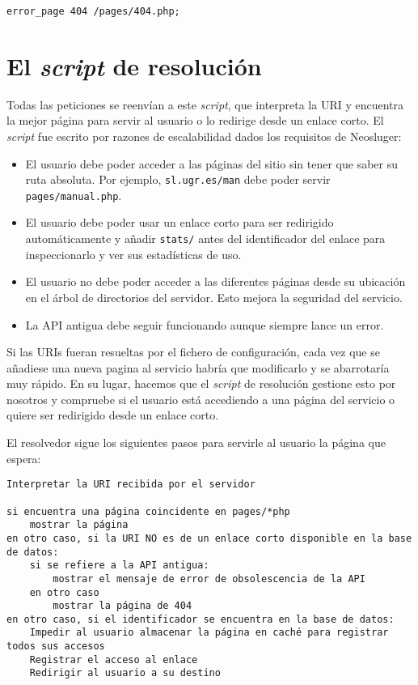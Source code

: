 \begin{lstlisting}
error_page 404 /pages/404.php;
\end{lstlisting}

\section{El \textit{script} de resolución}\label{el-script-de-resolucion}

Todas las peticiones se reenvían a este \textit{script}, que interpreta la URI y encuentra la mejor página para servir al usuario o lo redirige desde un enlace corto.
El \textit{script} fue escrito por razones de escalabilidad dados los requisitos de Neosluger:

\begin{itemize}
\item
	El usuario debe poder acceder a las páginas del sitio sin tener que saber su ruta absoluta.
	Por ejemplo, \texttt{sl.ugr.es/man} debe poder servir \texttt{pages/manual.php}.
\item
	El usuario debe poder usar un enlace corto para ser redirigido automáticamente y añadir \texttt{stats/} antes del identificador del enlace para inspeccionarlo y ver sus estadísticas de uso.
\item
	El usuario no debe poder acceder a las diferentes páginas desde su ubicación en el árbol de directorios del servidor.
	Esto mejora la seguridad del servicio.
\item
	La API antigua debe seguir funcionando aunque siempre lance un error.
\end{itemize}

Si las URIs fueran resueltas por el fichero de configuración, cada vez que se añadiese una nueva pagina al servicio habría que modificarlo y se abarrotaría muy rápido.
En su lugar, hacemos que el \textit{script} de resolución gestione esto por nosotros y compruebe si el usuario está accediendo a una página del servicio o quiere ser redirigido desde un enlace corto.

El resolvedor sigue los siguientes pasos para servirle al usuario la página que espera:

\begin{lstlisting}
Interpretar la URI recibida por el servidor

si encuentra una página coincidente en pages/*php
	mostrar la página
en otro caso, si la URI NO es de un enlace corto disponible en la base de datos:
	si se refiere a la API antigua:
		mostrar el mensaje de error de obsolescencia de la API
	en otro caso
		mostrar la página de 404
en otro caso, si el identificador se encuentra en la base de datos:
	Impedir al usuario almacenar la página en caché para registrar todos sus accesos
	Registrar el acceso al enlace
	Redirigir al usuario a su destino
\end{lstlisting}

